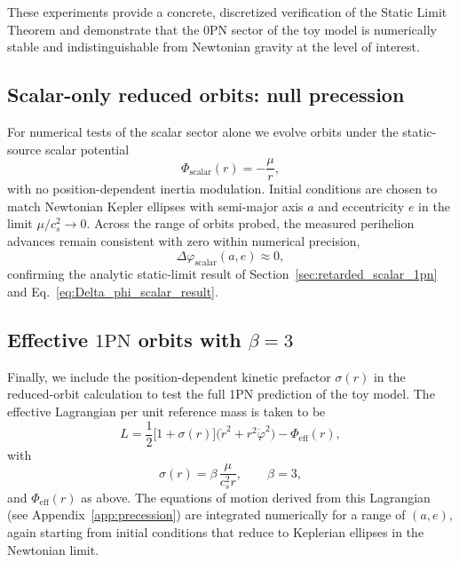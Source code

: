\documentclass[11pt]{article}
\newcommand{\PN}{\mathrm{PN}}
\newcommand{\cS}{c_s}
\begin{document}
These experiments provide a concrete, discretized verification of the Static Limit Theorem and demonstrate that the 0PN sector of the toy model is numerically stable and indistinguishable from Newtonian gravity at the level of interest.

\subsection{Scalar-only reduced orbits: null precession}
\label{sec:numerics_scalar}

For numerical tests of the scalar sector alone we evolve orbits under the
static-source scalar potential
\begin{equation}
  \Phi_{\mathrm{scalar}}(r) = -\frac{\mu}{r},
\end{equation}
with no position-dependent inertia modulation. Initial conditions are chosen to
match Newtonian Kepler ellipses with semi-major axis $a$ and eccentricity $e$ in
the limit $\mu/\cS^2 \to 0$. Across the range of orbits probed, the measured
perihelion advances remain consistent with zero within numerical precision,
\begin{equation}
  \Delta \varphi_{\mathrm{scalar}}(a,e) \approx 0,
\end{equation}
confirming the analytic static-limit result of
Section~\ref{sec:retarded_scalar_1pn} and Eq.~\eqref{eq:Delta_phi_scalar_result}.


\subsection{Effective \texorpdfstring{$1\PN$}{1PN} orbits with \texorpdfstring{$\beta = 3$}{beta = 3}}
\label{sec:numerics_beta}

Finally, we include the position-dependent kinetic prefactor $\sigma(r)$ in the reduced-orbit calculation to test the full 1PN prediction of the toy model. The effective Lagrangian per unit reference mass is taken to be
\begin{equation}
  L
  = \frac{1}{2}\bigl[1 + \sigma(r)\bigr]
      \bigl(\dot{r}^2 + r^2 \dot{\varphi}^2\bigr)
    - \Phi_{\mathrm{eff}}(r),
\end{equation}
with
\begin{equation}
  \sigma(r) = \beta\,\frac{\mu}{\cS^2 r},
  \qquad
  \beta = 3,
\end{equation}
and $\Phi_{\mathrm{eff}}(r)$ as above. The equations of motion derived from this Lagrangian (see Appendix~\ref{app:precession}) are integrated numerically for a range of $(a,e)$, again starting from initial conditions that reduce to Keplerian ellipses in the Newtonian limit.
\end{document}

